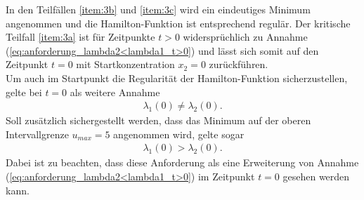 In den Teilfällen \ref{item:3b} und \ref{item:3c} wird ein eindeutiges Minimum angenommen und die Hamilton-Funktion ist entsprechend regulär. Der kritische Teilfall \ref{item:3a} ist für Zeitpunkte $t>0$ widersprüchlich zu Annahme (\ref{eq:anforderung_lambda2<lambda1_t>0}) und lässt sich somit auf den Zeitpunkt $t=0$ mit Startkonzentration $x_2 = 0$ zurückführen. \\
Um auch im Startpunkt die Regularität der Hamilton-Funktion sicherzustellen, gelte bei $t=0$ als weitere Annahme 
\begin{align}
\lambda_1(0) \neq \lambda_2(0). 
\end{align} 
Soll zusätzlich sichergestellt werden, dass das Minimum auf der oberen Intervallgrenze $u_{max} = 5$ angenommen wird, gelte sogar
\begin{align}
\lambda_1(0) > \lambda_2(0). \label{eq:anforderung_lambda1>lambda2_t=0}
\end{align}
Dabei ist zu beachten, dass diese Anforderung als eine Erweiterung von Annahme (\ref{eq:anforderung_lambda2<lambda1_t>0}) im Zeitpunkt $t=0$ gesehen werden kann. 

%

